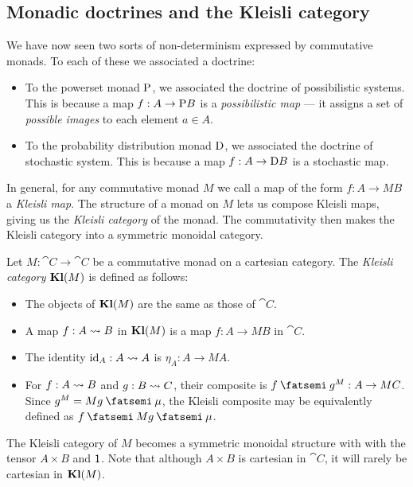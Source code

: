 \documentclass[DynamicalBook]{subfiles}
\begin{document}
\subsection{Monadic doctrines and the Kleisli category}\label{sec.monad_doctrine}
We have now seen two sorts of non-determinism expressed by commutative monads.
To each of these we associated a doctrine:
\begin{itemize}
  \item To the powerset monad $\mathrm{P}$, we associated the doctrine of
    possibilistic systems. This is because a map $f : A \to \mathrm{P} B$ is a
    \emph{possibilistic map} --- it assigns
    a set of \emph{possible images} to each element $a \in A$. 
  \item To the probability distribution monad $\mathrm{D}$, we associated the
    doctrine of stochastic system. This is because a map $f : A \to \mathrm{D} B$
    is a stochastic map.
\end{itemize}
In general, for any commutative monad $M$ we call a map of the form $f : A \to
MB$ a \emph{Kleisli map}. The structure of a monad on $M$ lets us compose
Kleisli maps, giving us the \emph{Kleisli category} of the monad. The
commutativity then makes the Kleisli category into a symmetric monoidal category.
\begin{definition}
  Let $M : \cat{C} \to \cat{C}$ be a commutative monad on a cartesian category. The \emph{Kleisli category} $\textbf{Kl}(M)$ is
  defined as follows:
  \begin{itemize}
    \item The objects of $\textbf{Kl}(M)$ are the same as those of $\cat{C}$.
    \item A map $f : A \rightsquigarrow B$ in $\textbf{Kl}(M)$ is a map $f : A \to MB$ in $\cat{C}$.
    \item The identity $\mathrm{id}_A : A \rightsquigarrow A$ is $\eta_A : A \to MA$.
    \item For $f : A \rightsquigarrow B$ and $g : B \rightsquigarrow C$, their composite is $f
      \then g^M : A \to MC$. Since $g^M = Mg \then \mu$, the Kleisli composite
      may be equivalently defined
      as $f \then Mg \then \mu$.
  \end{itemize}
  The Kleisli category of $M$ becomes a symmetric monoidal structure with with
  the tensor $A \times B$ and $\mathsf{1}$. Note that although $A \times B$ is
  cartesian in $\cat{C}$, it will rarely be cartesian in $\textbf{Kl}(M)$.
\end{definition}
\end{document}
